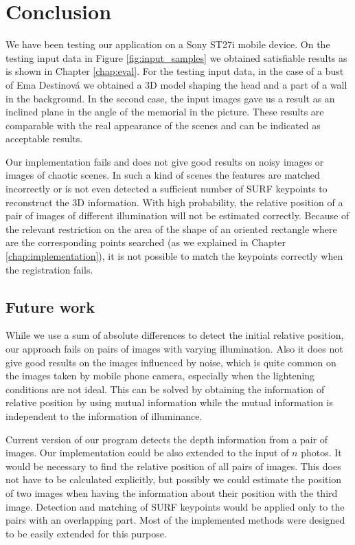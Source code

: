 \chapter*{Conclusion}

We have been testing our application on a Sony ST27i mobile device.
On the testing input data in Figure \ref{fig:input_samples} we obtained satisfiable results as is shown in Chapter \ref{chap:eval}.
For the testing input data, in the case of a bust of Ema Destinová we obtained a 3D model shaping the head and a part of a wall in the background.
In the second case, the input images gave us a result as an inclined plane in the angle of the memorial in the picture.
These results are comparable with the real appearance of the scenes and can be indicated as acceptable results.

Our implementation fails and does not give good results on noisy images or images of chaotic scenes.
In such a kind of scenes the features are matched incorrectly or is not even detected a sufficient number of SURF keypoints to reconstruct the 3D information. 
With high probability, the relative position of a pair of images of different illumination will not be estimated correctly.
Because of the relevant restriction on the area of the shape of an oriented rectangle where are the corresponding points searched (as we explained in Chapter \ref{chap:implementation}),
it is not possible to match the keypoints correctly when the registration fails.

\section*{Future work}

While we use a sum of absolute differences to detect the initial relative position, our approach fails on pairs of images with varying illumination.
Also it does not give good results on the images influenced by noise, which is quite common on the images taken by mobile phone camera, 
especially when the lightening conditions are not ideal.
This can be solved by obtaining the information of relative position by using mutual information while the mutual information is independent to the information of illuminance.

Current version of our program detects the  depth information from a pair of images.
Our implementation could be also extended to the input of $n$ photos. 
It would be necessary to find the relative position of all pairs of images.
This does not have to be calculated explicitly, but possibly we could estimate the position of two images when having the information about their position with the third image.
Detection and matching of SURF keypoints would be applied only to the pairs with an overlapping part.
Most of the implemented methods were designed to be easily extended for this purpose.


